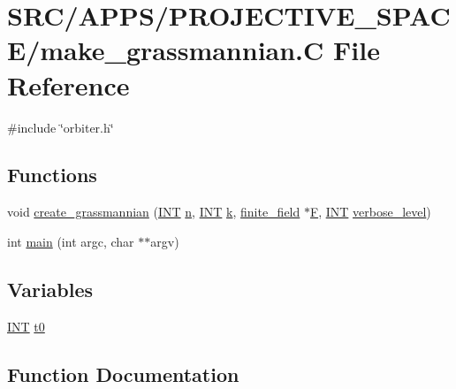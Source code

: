 \hypertarget{make__grassmannian_8_c}{}\section{S\+R\+C/\+A\+P\+P\+S/\+P\+R\+O\+J\+E\+C\+T\+I\+V\+E\+\_\+\+S\+P\+A\+C\+E/make\+\_\+grassmannian.C File Reference}
\label{make__grassmannian_8_c}
{\ttfamily \#include \char`\"{}orbiter.\+h\char`\"{}}\newline
\subsection*{Functions}
\begin{DoxyCompactItemize}
\item 
void \mbox{\hyperlink{make__grassmannian_8_c_adabd515cf859c5600117fe5be3e5e868}{create\+\_\+grassmannian}} (\mbox{\hyperlink{galois_8h_a09fddde158a3a20bd2dcadb609de11dc}{I\+NT}} \mbox{\hyperlink{simeon_8_c_a7f2cd26777ce0ff3fdaf8d02aacbddfb}{n}}, \mbox{\hyperlink{galois_8h_a09fddde158a3a20bd2dcadb609de11dc}{I\+NT}} \mbox{\hyperlink{simeon_8_c_a43fa990200c3ddd47c35f151bd4d66bf}{k}}, \mbox{\hyperlink{classfinite__field}{finite\+\_\+field}} $\ast$\mbox{\hyperlink{simeon_8_c_a21a61c535ff7d9d4b674461d3b19fffa}{F}}, \mbox{\hyperlink{galois_8h_a09fddde158a3a20bd2dcadb609de11dc}{I\+NT}} \mbox{\hyperlink{simeon_8_c_a818073fbcc2f439e7c56952f67386122}{verbose\+\_\+level}})
\item 
int \mbox{\hyperlink{make__grassmannian_8_c_a3c04138a5bfe5d72780bb7e82a18e627}{main}} (int argc, char $\ast$$\ast$argv)
\end{DoxyCompactItemize}
\subsection*{Variables}
\begin{DoxyCompactItemize}
\item 
\mbox{\hyperlink{galois_8h_a09fddde158a3a20bd2dcadb609de11dc}{I\+NT}} \mbox{\hyperlink{make__grassmannian_8_c_a4268f4fe222ffb119218a0199f5e1904}{t0}}
\end{DoxyCompactItemize}


\subsection{Function Documentation}
\mbox{\label{make__grassmannian_8_c_adabd515cf859c5600117fe5be3e5e868}} 
